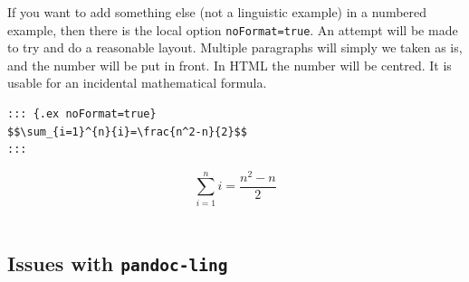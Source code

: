 \documentclass[
]{article}
\begin{document}
If you want to add something else (not a linguistic example) in a
numbered example, then there is the local option \texttt{noFormat=true}.
An attempt will be made to try and do a reasonable layout. Multiple
paragraphs will simply we taken as is, and the number will be put in
front. In HTML the number will be centred. It is usable for an
incidental mathematical formula.

\begin{verbatim}
::: {.ex noFormat=true}
$$\sum_{i=1}^{n}{i}=\frac{n^2-n}{2}$$
:::
\end{verbatim}

\begin{samepage}
  \[\sum_{i=1}^{n}{i}=\frac{n^2-n}{2}\]\\
  
\xe
\end{samepage}

\hypertarget{issues-with-pandoc-ling}{%
\subsection{\texorpdfstring{Issues with
\texttt{pandoc-ling}}{Issues with pandoc-ling}}\label{issues-with-pandoc-ling}}
\end{document}
